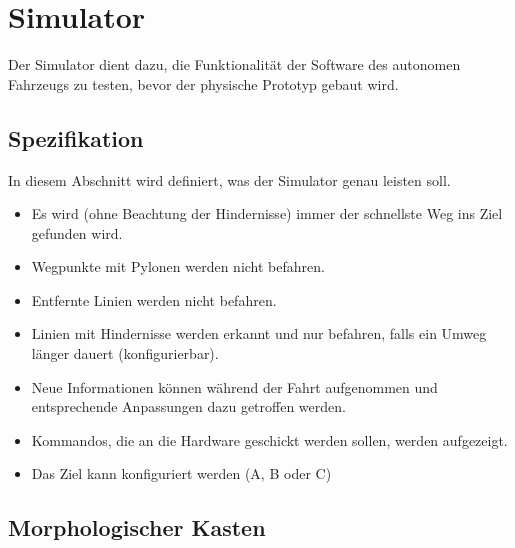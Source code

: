 \documentclass[../main.tex]{subfiles}
\begin{document}
\newpage
\section{Simulator}

Der Simulator dient dazu, die Funktionalität der Software des autonomen Fahrzeugs zu testen, bevor der physische Prototyp gebaut wird.

\subsection{Spezifikation}

In diesem Abschnitt wird definiert, was der Simulator genau leisten soll.


\begin{itemize}
    \item Es wird (ohne Beachtung der Hindernisse) immer der schnellste Weg ins Ziel gefunden wird.
    \item Wegpunkte mit Pylonen werden nicht befahren.
    \item Entfernte Linien werden nicht befahren.
    \item Linien mit Hindernisse werden erkannt und nur befahren, falls ein Umweg länger dauert (konfigurierbar).
    \item Neue Informationen können während der Fahrt aufgenommen und entsprechende Anpassungen dazu getroffen werden.
    \item Kommandos, die an die Hardware geschickt werden sollen, werden aufgezeigt.
    \item Das Ziel kann konfiguriert werden (A, B oder C)
\end{itemize}



\subsection{Morphologischer Kasten}

\end{document}

